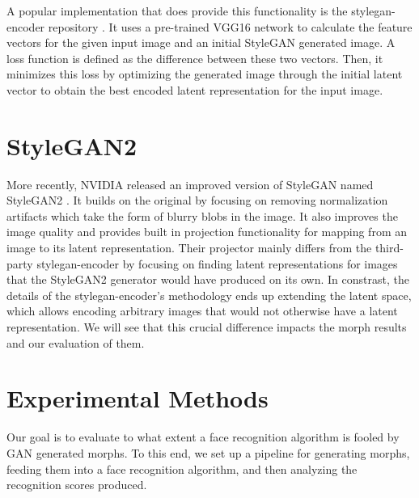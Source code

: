 \documentclass[12pt,twocolumn]{paper}
\begin{document}
\par
A popular implementation that does provide this functionality is the stylegan-encoder repository \cite{stylegan-encoder}. It uses a pre-trained VGG16 network to calculate the feature vectors for the given input image and an initial StyleGAN generated image. A loss function is defined as the difference between these two vectors. Then, it minimizes this loss by optimizing the generated image through the initial latent vector to obtain the best encoded latent representation for the input image.

\section{StyleGAN2}
\par
More recently, NVIDIA released an improved version of StyleGAN named StyleGAN2 \cite{stylegan2}. It builds on the original by focusing on removing normalization artifacts which take the form of blurry blobs in the image. It also improves the image quality and provides built in projection functionality for mapping from an image to its latent representation. Their projector mainly differs from the third-party stylegan-encoder by focusing on finding latent representations for images that the StyleGAN2 generator would have produced on its own. In constrast, the details of the stylegan-encoder's methodology ends up extending the latent space, which allows encoding arbitrary images that would not otherwise have a latent representation. We will see that this crucial difference impacts the morph results and our evaluation of them.

\section{Experimental Methods}
\par
Our goal is to evaluate to what extent a face recognition algorithm is fooled by GAN generated morphs. To this end, we set up a pipeline for generating morphs, feeding them into a face recognition algorithm, and then analyzing the recognition scores produced.
\end{document}
